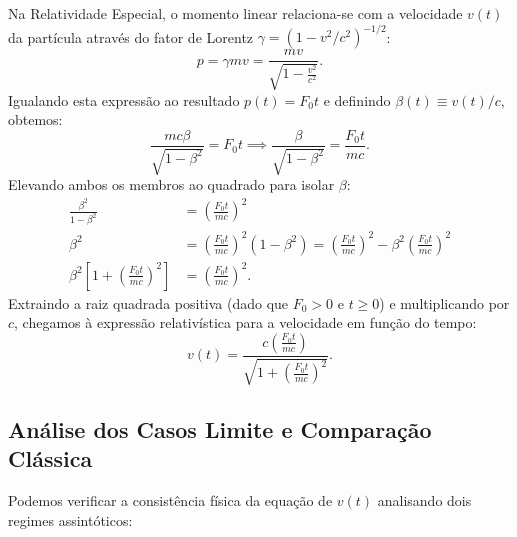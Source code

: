 \documentclass[11pt, a4paper]{article}
\begin{document}
Na Relatividade Especial, o momento linear relaciona-se com a velocidade $v(t)$ da partícula através do fator de Lorentz $\gamma = (1 - v^2/c^2)^{-1/2}$:
\begin{equation}
p = \gamma m v = \frac{m v}{\sqrt{1 - \frac{v^2}{c^2}}}.
\end{equation}
Igualando esta expressão ao resultado $p(t) = F_0 t$ e definindo $\beta(t) \equiv v(t)/c$, obtemos:
\begin{equation}
\frac{m c \beta}{\sqrt{1 - \beta^2}} = F_0 t \implies \frac{\beta}{\sqrt{1 - \beta^2}} = \frac{F_0 t}{m c}.
\end{equation}
Elevando ambos os membros ao quadrado para isolar $\beta$:
\begin{align}
\frac{\beta^2}{1 - \beta^2} &= \left(\frac{F_0 t}{m c}\right)^2 \nonumber \\
\beta^2 &= \left(\frac{F_0 t}{m c}\right)^2 (1 - \beta^2) = \left(\frac{F_0 t}{m c}\right)^2 - \beta^2 \left(\frac{F_0 t}{m c}\right)^2 \nonumber \\
\beta^2 \left[ 1 + \left(\frac{F_0 t}{m c}\right)^2 \right] &= \left(\frac{F_0 t}{m c}\right)^2.
\end{align}
Extraindo a raiz quadrada positiva (dado que $F_0 > 0$ e $t \ge 0$) e multiplicando por $c$, chegamos à expressão relativística para a velocidade em função do tempo:
\begin{equation}
v(t) = \frac{c \left(\frac{F_0 t}{m c}\right)}{\sqrt{1 + \left(\frac{F_0 t}{m c}\right)^2}}.
\end{equation}

\subsection{Análise dos Casos Limite e Comparação Clássica}

Podemos verificar a consistência física da equação de $v(t)$ analisando dois regimes assintóticos:
\end{document}
